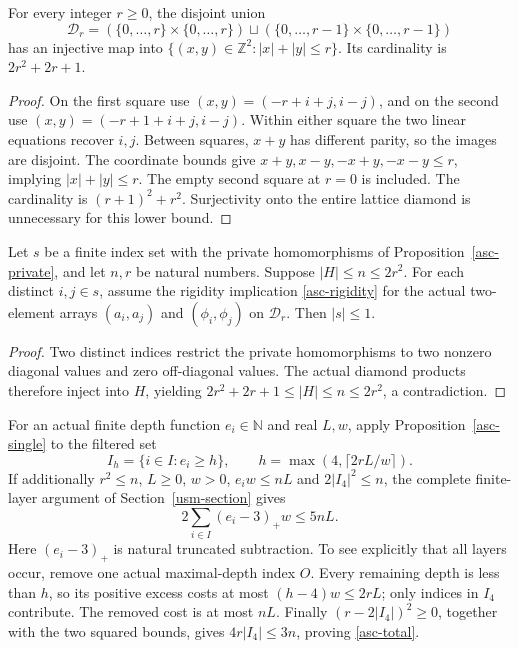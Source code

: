 \begin{lemma}\label{asc-diamond}
For every integer $r\ge0$, the disjoint union
\[
 \mathcal D_r=
 (\{0,\ldots,r\}\times\{0,\ldots,r\})\sqcup
 (\{0,\ldots,r-1\}\times\{0,\ldots,r-1\})
\]
has an injective map into $\{(x,y)\in\mathbb Z^2:|x|+|y|\le r\}$.
Its cardinality is $2r^2+2r+1$.
\end{lemma}
\begin{proof}
On the first square use $(x,y)=(-r+i+j,i-j)$, and on the second
use $(x,y)=(-r+1+i+j,i-j)$. Within either square the two linear
equations recover $i,j$. Between squares, $x+y$ has different parity,
so the images are disjoint. The coordinate bounds give
$x+y,x-y,-x+y,-x-y\le r$, implying $|x|+|y|\le r$.
The empty second square at $r=0$ is included. The cardinality is
$(r+1)^2+r^2$. Surjectivity onto the entire lattice diamond is
unnecessary for this lower bound.
\end{proof}

\begin{proposition}
\label{asc-single}
Let $s$ be a finite index set with the private homomorphisms of
Proposition~\ref{asc-private}, and let $n,r$ be natural numbers.
Suppose $|H|\le n\le2r^2$.
For each distinct $i,j\in s$, assume the rigidity implication
\eqref{asc-rigidity} for the actual two-element arrays
$(a_i,a_j)$ and $(\phi_i,\phi_j)$ on $\mathcal D_r$.
Then $|s|\le1$.
\end{proposition}
\begin{proof}
Two distinct indices restrict the private homomorphisms to two
nonzero diagonal values and zero off-diagonal values. The actual
diamond products therefore inject into $H$, yielding
$2r^2+2r+1\le |H|\le n\le2r^2$, a contradiction.
\end{proof}

For an actual finite depth function $e_i\in\mathbb N$ and real $L,w$, apply
Proposition~\ref{asc-single} to the filtered set
\[
 I_h=\{i\in I:e_i\ge h\},\qquad
 h=\max(4,\lceil2rL/w\rceil).
\]
If additionally $r^2\le n$, $L\ge0$, $w>0$,
$e_iw\le nL$ and $2|I_4|^2\le n$, the complete finite-layer
argument of Section~\ref{usm-section} gives
\begin{equation}\label{asc-total}
 2\sum_{i\in I}(e_i-3)_+w\le5nL.
\end{equation}
Here $(e_i-3)_+$ is natural truncated subtraction. To see explicitly
that all layers occur, remove one actual maximal-depth index $O$.
Every remaining depth is less than $h$, so its positive excess costs
at most $(h-4)w\le2rL$; only indices in $I_4$ contribute.
The removed cost is at most $nL$. Finally
$(r-2|I_4|)^2\ge0$, together with the two squared bounds, gives
$4r|I_4|\le3n$, proving \eqref{asc-total}.

